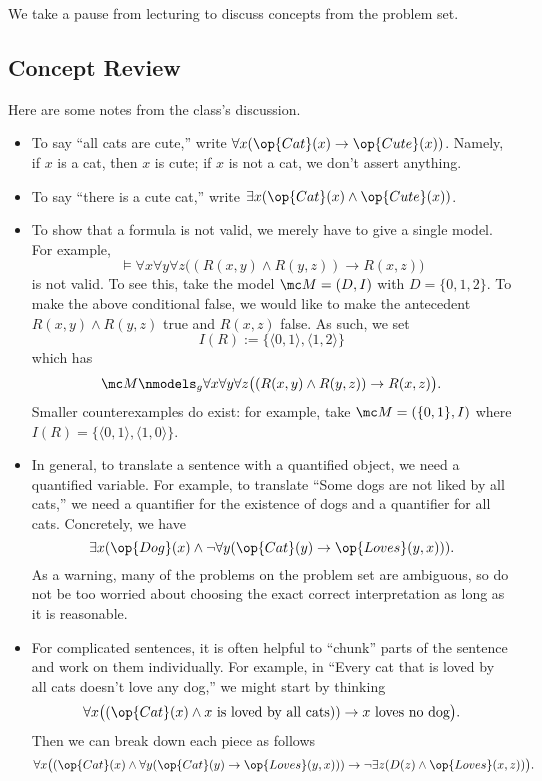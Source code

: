 
We take a pause from lecturing to discuss concepts from the problem set.

\subsection{Concept Review}
Here are some notes from the class's discussion.
\begin{itemize}
	\item To say ``all cats are cute,'' write $\forall x(\op{Cat}(x)\to\op{Cute}(x))$. Namely, if $x$ is a cat, then $x$ is cute; if $x$ is not a cat, we don't assert anything.
	\item To say ``there is a cute cat,'' write $\exists x(\op{Cat}(x)\land\op{Cute}(x))$.
	\item To show that a formula is not valid, we merely have to give a single model. For example,
	\[\models\forall x\forall y\forall z\big((R(x,y)\land R(y,z))\to R(x,z)\big)\]
	is not valid. To see this, take the model $\mc M=(D,I)$ with $D=\{0,1,2\}$. To make the above conditional false, we would like to make the antecedent $R(x,y)\land R(y,z)$ true and $R(x,z)$ false. As such, we set
	\[I(R):=\{\langle0,1\rangle,\langle1,2\rangle\}\]
	which has
	\[\mc M\nmodels_{g}\forall x\forall y\forall z\big((R(x,y)\land R(y,z))\to R(x,z)\big).\]
	Smaller counterexamples do exist: for example, take $\mc M=(\{0,1\},I)$ where $I(R)=\{\langle0,1\rangle,\langle1,0\rangle\}$.
	\item In general, to translate a sentence with a quantified object, we need a quantified variable. For example, to translate ``Some dogs are not liked by all cats,'' we need a quantifier for the existence of dogs and a quantifier for all cats. Concretely, we have
	\[\exists x(\op{Dog}(x)\land\lnot\forall y(\op{Cat}(y)\to\op{Loves}(y,x))).\]
	As a warning, many of the problems on the problem set are ambiguous, so do not be too worried about choosing the exact correct interpretation as long as it is reasonable.
	\item For complicated sentences, it is often helpful to ``chunk'' parts of the sentence and work on them individually. For example, in ``Every cat that is loved by all cats doesn't love any dog,'' we might start by thinking
	\[\forall x\big((\op{Cat}(x)\land\text{$x$ is loved by all cats}))\to\text{$x$ loves no dog}\big).\]
	Then we can break down each piece as follows
	\[\forall x\big((\op{Cat}(x)\land\forall y(\op{Cat}(y)\to\op{Loves}(y,x)))\to\lnot\exists z(D(z)\land\op{Loves}(x,z))\big).\]

\end{itemize}
